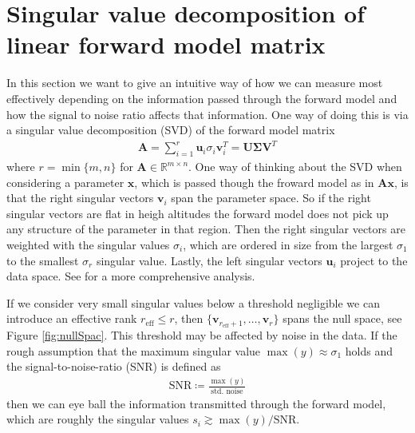 \section{Singular value decomposition of linear forward model matrix}
In this section we want to give an intuitive way of how we can measure most effectively depending on the information passed through the forward model and how the signal to noise ratio affects that information.
One way of doing this is via a singular value decomposition (SVD) of the forward model matrix
\begin{align}
	\bm{A} = \sum_{i =1}^{r} \bm{u}_i  \sigma_i \bm{v}^T_i = \bm{U} \bm{\Sigma} \bm{V}^T
\end{align}
where $r = \min\{m,n\}$ for $\bm{A} \in \mathbb{R}^{m \times n}$.
One way of thinking about the SVD when considering a parameter $\bm{x}$, which is passed though the froward model as in $\bm{A}\bm{x}$, is that the right singular vectors $\bm{v}_i$ span the parameter space.
So if the right singular vectors are flat in heigh altitudes the forward model does not pick up any structure of the parameter in that region.
Then the right singular vectors are weighted with the singular values $\sigma_i$, which are ordered in size from the largest $\sigma_1$ to the smallest $\sigma_{r}$ singular value.
Lastly, the left singular vectors $ \bm{u}_i$ project to the data space.
See \cite{tan2016LecNot} for a more comprehensive analysis.

If we consider very small singular values below a threshold negligible we can introduce an effective rank $r_{\text{eff}} \leq r$, then $ \{\bm{v}_{r_{\text{eff}} +1}, \dots ,\bm{v}_r \}$ spans the null space, see Figure \ref{fig:nullSpac}.
This threshold may be affected by noise in the data.
If the rough assumption that the maximum singular value $\max(y) \approx \sigma_1$ holds and the signal-to-noise-ratio (SNR) is defined as 
\begin{align}
	\text{SNR} \coloneqq \frac{\max(y)}{\text{std. noise}}
\end{align}
then we can eye ball the information transmitted through the forward model, which are roughly the singular values $s_i \gtrsim \max(y)/ \text{SNR}$.


